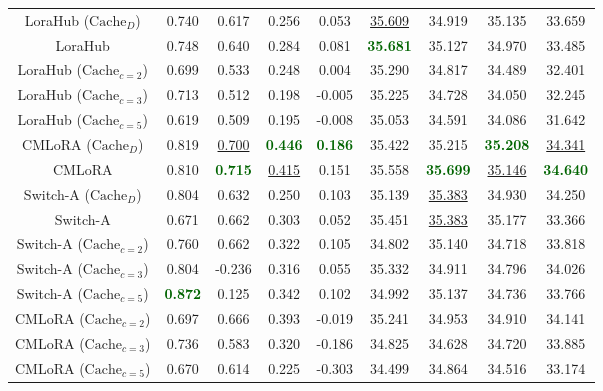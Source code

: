 \begin{table}[H]
\begin{center}
\begin{tabular}{c|cccc|cccc}
LoraHub ($\text{Cache}_{D}$) & 0.740 & 0.617 & 0.256 & 0.053 & \underline{35.609} & 34.919 & 35.135 & 33.659 \\
LoraHub & 0.748 & 0.640 & 0.284 & 0.081 & \textcolor{darkgreen}{\textbf{35.681}} & 35.127 & 34.970 & 33.485 \\
LoraHub ($\text{Cache}_{c=2}$) & 0.699 & 0.533 & 0.248 & 0.004 & 35.290 & 34.817 & 34.489 & 32.401 \\
LoraHub ($\text{Cache}_{c=3}$) & 0.713 & 0.512 & 0.198 & -0.005 & 35.225 & 34.728 & 34.050 & 32.245 \\
LoraHub ($\text{Cache}_{c=5}$) & 0.619 & 0.509 & 0.195 & -0.008 & 35.053 & 34.591 & 34.086 & 31.642 \\

\midrule
CMLoRA ($\text{Cache}_{D}$) & 0.819 & \underline{0.700} & \textcolor{darkgreen}{\textbf{0.446}} & \textcolor{darkgreen}{\textbf{0.186}} & 35.422 & 35.215 & \textcolor{darkgreen}{\textbf{35.208}} & \underline{34.341} \\
CMLoRA & 0.810 & \textcolor{darkgreen}{\textbf{0.715}} & \underline{0.415} & 0.151 & 35.558 & \textcolor{darkgreen}{\textbf{35.699}} & \underline{35.146} & \textcolor{darkgreen}{\textbf{34.640}} \\
Switch-A ($\text{Cache}_{D}$) & 0.804 & 0.632 & 0.250 & 0.103 & 35.139 & \underline{35.383} & 34.930 & 34.250 \\
Switch-A & 0.671 & 0.662 & 0.303 & 0.052 & 35.451 & \underline{35.383} & 35.177 & 33.366 \\
Switch-A ($\text{Cache}_{c=2}$) & 0.760 & 0.662 & 0.322 & 0.105 & 34.802 & 35.140 & 34.718 & 33.818 \\
Switch-A ($\text{Cache}_{c=3}$) & 0.804 & -0.236 & 0.316 & 0.055 & 35.332 & 34.911 & 34.796 & 34.026 \\
Switch-A ($\text{Cache}_{c=5}$) & \textcolor{darkgreen}{\textbf{0.872}} & 0.125 & 0.342 & 0.102 & 34.992 & 35.137 & 34.736 & 33.766 \\
CMLoRA ($\text{Cache}_{c=2}$) & 0.697 & 0.666 & 0.393 & -0.019 & 35.241 & 34.953 & 34.910 & 34.141 \\
CMLoRA ($\text{Cache}_{c=3}$) & 0.736 & 0.583 & 0.320 & -0.186 & 34.825 & 34.628 & 34.720 & 33.885 \\
CMLoRA ($\text{Cache}_{c=5}$) & 0.670 & 0.614 & 0.225 & -0.303 & 34.499 & 34.864 & 34.516 & 33.174 \\
\bottomrule
\end{tabular}
\end{center}
\end{table}
